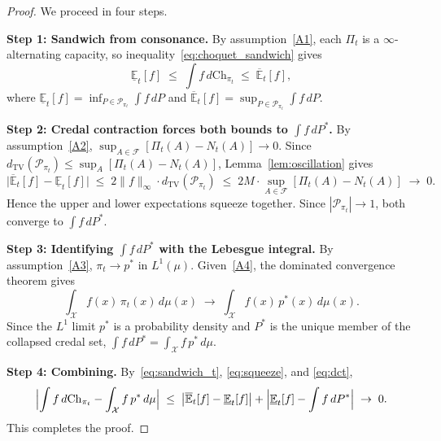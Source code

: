 \documentclass[12pt]{article}
\newcommand{\calF}{\mathcal{F}}
\newcommand{\calX}{\mathcal{X}}
\newcommand{\E}{\mathbb{E}}
\newcommand{\Lone}{L^1}
\begin{document}
\begin{proof}
We proceed in four steps.

\smallskip\noindent
\textbf{Step 1: Sandwich from consonance.}
By assumption~\eqref{A1}, each $\Pi_t$ is a $\infty$-alternating capacity,
so inequality~\eqref{eq:choquet_sandwich} gives
\begin{equation}
\underline{\E}_t[f]
\;\le\;
\int f\,d\mathrm{Ch}_{\pi_t}
\;\le\;
\overline{\E}_t[f],
\label{eq:sandwich_t}
\end{equation}
where $\underline{\E}_t[f]=\inf_{P\in\mathcal{P}_{\pi_t}}\int f\,dP$ and
$\overline{\E}_t[f]=\sup_{P\in\mathcal{P}_{\pi_t}}\int f\,dP$.

\smallskip\noindent
\textbf{Step 2: Credal contraction forces both bounds to $\int f\,dP^*$.}
By assumption~\eqref{A2}, $\sup_{A\in\calF}[\Pi_t(A)-N_t(A)]\to 0$.
Since $d_{\mathrm{TV}}(\mathcal{P}_{\pi_t})\le\sup_A[\Pi_t(A)-N_t(A)]$,
Lemma~\ref{lem:oscillation} gives
\begin{equation}
\bigl|\overline{\E}_t[f]-\underline{\E}_t[f]\bigr|
\;\le\; 2\|f\|_\infty\cdot d_{\mathrm{TV}}(\mathcal{P}_{\pi_t})
\;\le\; 2M\cdot\sup_{A\in\calF}[\Pi_t(A)-N_t(A)]
\;\to\; 0.
\label{eq:squeeze}
\end{equation}
Hence the upper and lower expectations squeeze together.
Since $|\mathcal{P}_{\pi_t}|\to 1$, both converge to $\int f\,dP^*$.

\smallskip\noindent
\textbf{Step 3: Identifying $\int f\,dP^*$ with the Lebesgue integral.}
By assumption~\eqref{A3}, $\pi_t\to p^*$ in $\Lone(\mu)$.
Given~\eqref{A4}, the dominated convergence theorem gives
\begin{equation}
\int_\calX f(x)\,\pi_t(x)\,d\mu(x)
\;\to\;
\int_\calX f(x)\,p^*(x)\,d\mu(x).
\label{eq:dct}
\end{equation}
Since the $\Lone$ limit $p^*$ is a probability density and $P^*$ is the unique
member of the collapsed credal set, $\int f\,dP^*=\int_\calX f\,p^*\,d\mu$.

\smallskip\noindent
\textbf{Step 4: Combining.}
By~\eqref{eq:sandwich_t}, \eqref{eq:squeeze}, and \eqref{eq:dct},
\[
\Bigl|\int f\,d\mathrm{Ch}_{\pi_t}
  - \int_\calX f\,p^*\,d\mu\Bigr|
\;\le\;
\bigl|\overline{\E}_t[f]-\underline{\E}_t[f]\bigr|
+ \Bigl|\underline{\E}_t[f] - \int f\,dP^*\Bigr|
\;\to\; 0.
\]
This completes the proof.
\end{proof}
\end{document}
